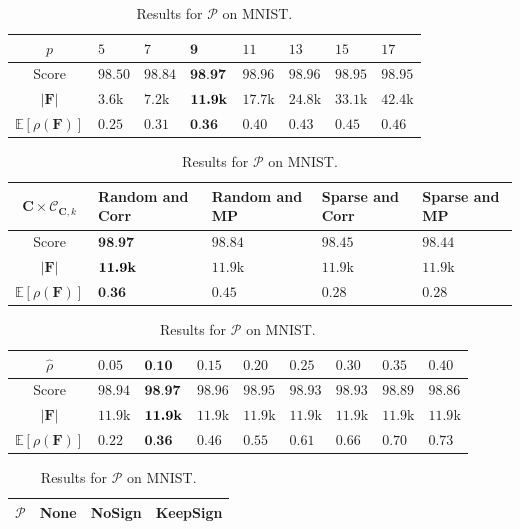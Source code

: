 \documentclass[12pt,a4paper,oneside,english]{UPBThesis}
\newcommand{\hctimes}[2]{{#1}\!\times\!{#2}}
\begin{document}
\renewcommand{\arraystretch}{1.2}
\begin{table}
  \caption{Results for $p$ on MNIST.}
  \label{table:RecoderEvMNISTp}
  \begin{tabularx}{\textwidth}{|c|RRRRRRR|}
    \hline
    $p$ & $5$ & $7$ & $\textbf{9}$ & $11$ & $13$ & $15$ & $17$ \tabularnewline\hline\hline
    Score & $98.50$ & $98.84$ & $\textbf{98.97}$ & $98.96$ & $98.96$ & $98.95$ & $98.95$ \tabularnewline
    $\left|\textbf{F}\right|$ & $3.6$k & $7.2$k & $\textbf{11.9\mbox{k}}$ & $17.7$k & $24.8$k & $33.1$k & $42.4$k \tabularnewline
    $\mathbb{E}[\rho(\textbf{F})]$ & $0.25$ & $0.31$ & $\textbf{0.36}$ & $0.40$ & $0.43$ & $0.45$ & $0.46$ \tabularnewline
    \hline
  \end{tabularx}
  \caption{Results for $\hctimes{\textbf{C}}{\mathcal{C}_{\textbf{C},k}}$ on MNIST.}
  \label{table:RecoderEvMNISTCCCk}
  \begin{tabularx}{\textwidth}{|c|RRRR|}
    \hline
    $\hctimes{\textbf{C}}{\mathcal{C}_{\textbf{C},k}}$ & \textbf{Random and Corr} & Random and \textbf{MP} & Sparse and \textbf{Corr} & Sparse and \textbf{MP} \tabularnewline\hline\hline
    Score & $\textbf{98.97}$ & $98.84$ & $98.45$ & $98.44$ \tabularnewline
    $\left|\textbf{F}\right|$ & $\textbf{11.9\mbox{k}}$ & $11.9$k & $11.9$k & $11.9$k \tabularnewline
    $\mathbb{E}[\rho(\textbf{F})]$ & $\textbf{0.36}$ & $0.45$ & $0.28$ & $0.28$ \tabularnewline
    \hline
  \end{tabularx}
  \caption{Results for $\hat{\rho}$ on MNIST.}
  \label{table:RecoderEvMNISTrho}
  \begin{tabularx}{\textwidth}{|c|RRRRRRRR|}
    \hline
    $\hat{\rho}$ & $0.05$ & $\textbf{0.10}$ & $0.15$ & $0.20$ & $0.25$ & $0.30$ & $0.35$ & $0.40$ \tabularnewline\hline\hline
    Score & $98.94$ & $\textbf{98.97}$ & $98.96$ & $98.95$ & $98.93$ & $98.93$ & $98.89$ & $98.86$ \tabularnewline
    $\left|\textbf{F}\right|$ & $11.9$k & $\textbf{11.9\mbox{k}}$ & $11.9$k & $11.9$k & $11.9$k & $11.9$k & $11.9$k & $11.9$k \tabularnewline
    $\mathbb{E}[\rho(\textbf{F})]$ & $0.22$ & $\textbf{0.36}$ & $0.46$ & $0.55$ & $0.61$ & $0.66$ & $0.70$ & $0.73$ \tabularnewline
    \hline
  \end{tabularx}
  \caption{Results for $\mathcal{P}$ on MNIST.}
  \label{table:RecoderEvMNISTP}
  \begin{tabularx}{\textwidth}{|c|RRR|}
    \hline
    $\mathcal{P}$ & None & \textbf{NoSign} & KeepSign \tabularnewline\hline\hline

\end{tabularx}
\end{table}
\end{document}
